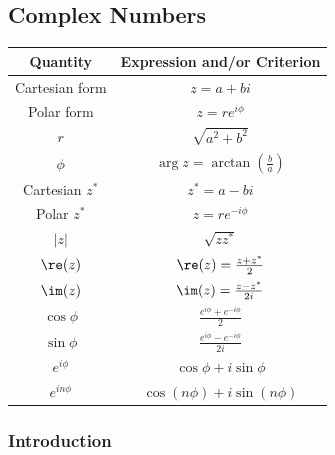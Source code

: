 \documentclass[10pt]{mypackage}
\begin{document}
\subsection{Complex Numbers}%
\begin{center}
  \renewcommand{\arraystretch}{1.75}
  \begin{tabular}{c|c}
    Quantity & Expression and/or Criterion\\
    \hline\hline
    Cartesian form & $z = a + bi$\\
    Polar form & $z = re^{i\phi}$\\
    $r$ & $\sqrt{a^2 + b^2}$\\
    $\phi$ & $\arg z = \arctan\left(\frac{b}{a}\right)$\\
    \hline
    Cartesian $z^{\ast}$ & $z^{\ast} = a-bi$\\
    Polar $z^{\ast}$ & $z = re^{-i\phi}$\\
    $|z|$ & $\sqrt{zz^{\ast}}$\\
    \hline
    $\re(z)$ & $\re(z) = \frac{z + z^{\ast}}{2}$\\
    $\im(z)$ & $\im(z) = \frac{z - z^{\ast}}{2i}$\\
    $\cos\phi$ & $\frac{e^{i\phi} + e^{-i\phi}}{2}$\\
    $\sin\phi$ & $\frac{e^{i\phi} - e^{-i\phi}}{2i}$\\
    \hline
    $e^{i\phi}$ & $\cos \phi + i\sin\phi$\\
    $e^{in\phi}$ & $\cos \left(n\phi\right) + i\sin \left(n\phi\right)$
  \end{tabular}
\end{center}
\subsubsection{Introduction}%
\end{document}
